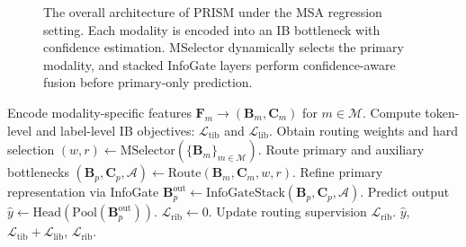 \documentclass[11pt]{article}
\begin{document}
\begin{figure}[t]
  \centering
  \caption{The overall architecture of PRISM under the MSA regression setting.
  Each modality is encoded into an IB bottleneck with confidence estimation.
  MSelector dynamically selects the primary modality, and stacked InfoGate
  layers perform confidence-aware fusion before primary-only prediction.}
  \label{fig:arch}
\end{figure}

\begin{algorithm}[t]
  \caption{PRISM forward pass on a batch.}
  \label{alg:forward}
  \begin{algorithmic}[1]
    \STATE Encode modality-specific features
    $\mathbf{F}_m \rightarrow (\mathbf{B}_m, \mathbf{C}_m)$
    for $m \in \mathcal{M}$.
    \STATE Compute token-level and label-level IB objectives:
    $\mathcal{L}_{\mathrm{tib}}$ and $\mathcal{L}_{\mathrm{lib}}$.
    \STATE Obtain routing weights and hard selection
    $(w,r) \leftarrow \mathrm{MSelector}(\{\mathbf{B}_m\}_{m\in\mathcal{M}})$.
    \STATE Route primary and auxiliary bottlenecks
    $(\mathbf{B}_p,\mathbf{C}_p,\mathcal{A})
    \leftarrow \mathrm{Route}(\mathbf{B}_m,\mathbf{C}_m,w,r)$.
    \STATE Refine primary representation via InfoGate
    $\mathbf{B}_p^{\mathrm{out}} \leftarrow
    \mathrm{InfoGateStack}(\mathbf{B}_p,\mathbf{C}_p,\mathcal{A})$.
    \STATE Predict output
    $\hat{y} \leftarrow
    \mathrm{Head}(\mathrm{Pool}(\mathbf{B}_p^{\mathrm{out}}))$.
    \STATE $\mathcal{L}_{\mathrm{rib}} \leftarrow 0$.
      \STATE Update routing supervision $\mathcal{L}_{\mathrm{rib}}$.
    \ENDIF
    \RETURN $\hat{y}$,
    $\mathcal{L}_{\mathrm{tib}}+\mathcal{L}_{\mathrm{lib}}$,
    $\mathcal{L}_{\mathrm{rib}}$.
  \end{algorithmic}
\end{algorithm}
\end{document}
